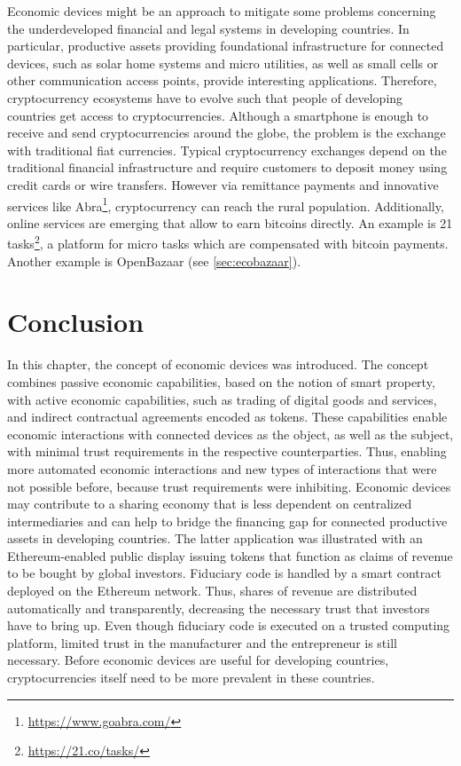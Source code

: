 Economic devices might be an approach to mitigate some problems concerning the underdeveloped financial and legal systems in developing countries. In particular, productive assets providing foundational infrastructure for connected devices, such as solar home systems and micro utilities, as well as small cells or other communication access points, provide interesting applications. Therefore, cryptocurrency ecosystems have to evolve such that people of developing countries get access to cryptocurrencies. Although a smartphone is enough to receive and send cryptocurrencies around the globe, the problem is the exchange with traditional fiat currencies. Typical cryptocurrency exchanges depend on the traditional financial infrastructure and require customers to deposit money using credit cards or wire transfers. However via remittance payments and innovative services like Abra\footnote{\url{https://www.goabra.com/}}, cryptocurrency can reach the rural population. Additionally, online services are emerging that allow to earn bitcoins directly. An example is 21 tasks\footnote{\url{https://21.co/tasks/}}, a platform for micro tasks which are compensated with bitcoin payments. Another example is OpenBazaar (see \ref{sec:ecobazaar}). 


\section{Conclusion}

In this chapter, the concept of economic devices was introduced. The concept combines passive economic capabilities, based on the notion of smart property, with active economic capabilities, such as trading of digital goods and services, and indirect contractual agreements encoded as tokens. These capabilities enable economic interactions with connected devices as the object, as well as the subject, with minimal trust requirements in the respective counterparties. Thus, enabling more automated economic interactions and new types of interactions that were not possible before, because trust requirements were inhibiting. Economic devices may contribute to a sharing economy that is less dependent on centralized intermediaries and can help to bridge the financing gap for connected productive assets in developing countries. The latter application was illustrated with an Ethereum-enabled public display issuing tokens that function as claims of revenue to be bought by global investors. Fiduciary code is handled by a smart contract deployed on the Ethereum network. Thus, shares of revenue are distributed automatically and transparently, decreasing the necessary trust that investors have to bring up. Even though fiduciary code is executed on a trusted computing platform, limited trust in the manufacturer and the entrepreneur is still necessary. Before economic devices are useful for developing countries, cryptocurrencies itself need to be more prevalent in these countries.